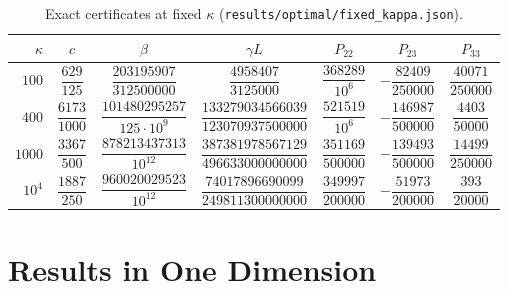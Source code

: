 \documentclass[11pt, a4paper]{article}
\theoremstyle{definition}
\begin{document}
\begin{table}[ht]
  \centering
  \caption{Exact certificates at fixed $\kappa$ (\texttt{results/optimal/fixed\_kappa.json}).}
  \label{tab:fixed}
  \small
  \renewcommand{\arraystretch}{2.6}
  \setlength{\tabcolsep}{5pt}
  \begin{tabular}{rcccccc}
    \toprule
    $\kappa$ & $c$ & $\beta$ & $\gamma L$ & $P_{22}$ & $P_{23}$ & $P_{33}$ \\
    \midrule
    $100$ & $\dfrac{629}{125}$ & $\dfrac{203195907}{312500000}$ & $\dfrac{4958407}{3125000}$ & $\dfrac{368289}{10^6}$ & $-\dfrac{82409}{250000}$ & $\dfrac{40071}{250000}$ \\
    $400$ & $\dfrac{6173}{1000}$ & $\dfrac{101480295257}{125\cdot10^9}$ & $\dfrac{133279034566039}{123070937500000}$ & $\dfrac{521519}{10^6}$ & $-\dfrac{146987}{500000}$ & $\dfrac{4403}{50000}$ \\
    $1000$ & $\dfrac{3367}{500}$ & $\dfrac{878213437313}{10^{12}}$ & $\dfrac{387381978567129}{496633000000000}$ & $\dfrac{351169}{500000}$ & $-\dfrac{139493}{500000}$ & $\dfrac{14499}{250000}$ \\
    $10^4$ & $\dfrac{1887}{250}$ & $\dfrac{960020029523}{10^{12}}$ & $\dfrac{74017896690099}{249811300000000}$ & $\dfrac{349997}{200000}$ & $-\dfrac{51973}{200000}$ & $\dfrac{393}{20000}$ \\[4pt]
    \bottomrule
  \end{tabular}
\end{table}

\section{Results in One Dimension}
\label{app:onedim}
\end{document}
